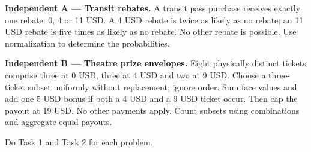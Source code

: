 \medskip
\noindent\begin{minipage}[t]{.48\linewidth}
\vspace{0pt}
{\setlength{\fboxsep}{2pt}\colorbox{black!10}{\textbf{Independent A --- Transit rebates.}}}
A transit pass purchase receives exactly one rebate: 0, 4 or 11 USD.
A 4 USD rebate is twice as likely as no rebate; an 11 USD rebate is
five times as likely as no rebate. No other rebate is possible.
Use normalization to determine the probabilities.
\end{minipage}\hfill
\begin{minipage}[t]{.48\linewidth}
\vspace{0pt}
{\setlength{\fboxsep}{2pt}\colorbox{black!10}{\textbf{Independent B --- Theatre prize envelopes.}}}
Eight physically distinct tickets comprise three at 0 USD, three at 4 USD
and two at 9 USD. Choose a three-ticket subset uniformly without replacement;
ignore order. Sum face values and add one 5 USD bonus if both a 4 USD and
a 9 USD ticket occur. Then cap the payout at 19 USD. No other payments apply.
Count subsets using combinations and aggregate equal payouts.
\end{minipage}\par
Do Task 1 and Task 2 for each problem.
\endgroup

